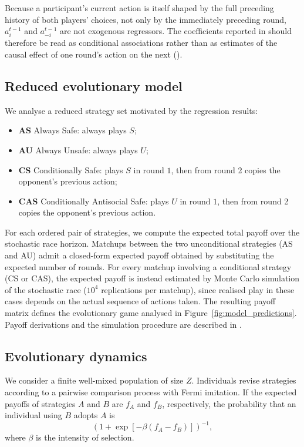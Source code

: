 \documentclass[pdflatex,sn-mathphys-ay]{sn-jnl}
\theoremstyle{thmstyleone}
\theoremstyle{thmstyletwo}
\theoremstyle{thmstylethree}
\begin{document}
Because a participant's current action is itself shaped by the full preceding history of both players' choices, not only by the immediately preceding round, \(a_i^{t-1}\) and \(a_{-i}^{t-1}\) are not exogenous regressors. The coefficients reported in  should therefore be read as conditional associations rather than as estimates of the causal effect of one round's action on the next ().

\subsection{Reduced evolutionary model}

We analyse a reduced strategy set motivated by the regression results:
\begin{itemize}
    \item \textbf{AS} Always Safe: always plays \(S\);
    \item \textbf{AU} Always Unsafe: always plays \(U\);
    \item \textbf{CS} Conditionally Safe: plays \(S\) in round \(1\), then from round 2 copies the opponent's previous action;
    \item \textbf{CAS} Conditionally Antisocial Safe: plays \(U\) in round \(1\), then from round 2 copies the opponent's previous action.
\end{itemize}

For each ordered pair of strategies, we compute the expected total payoff over the stochastic race horizon. Matchups between the two unconditional strategies (AS and AU) admit a closed-form expected payoff obtained by substituting the expected number of rounds. For every matchup involving a conditional strategy (CS or CAS), the expected payoff is instead estimated by Monte Carlo simulation of the stochastic race ($10^4$ replications per matchup), since realised play in these cases depends on the actual sequence of actions taken. The resulting payoff matrix defines the evolutionary game analysed in Figure~\ref{fig:model_predictions}. Payoff derivations and the simulation procedure are described in .

\subsection{Evolutionary dynamics}

We consider a finite well-mixed population of size \(Z\). Individuals revise strategies according to a pairwise comparison process with Fermi imitation. If the expected payoffs of strategies \(A\) and \(B\) are \(f_A\) and \(f_B\), respectively, the probability that an individual using \(B\) adopts \(A\) is
\[
\left(1+\exp[-\beta(f_A-f_B)]\right)^{-1},
\]
where \(\beta\) is the intensity of selection.
\end{document}
